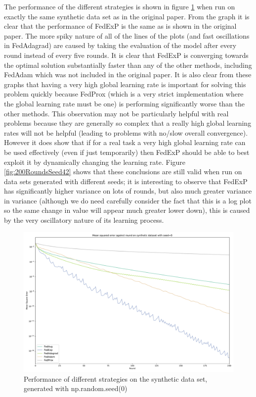 \documentclass{article}
\begin{document}
The performance of the different strategies is shown in figure \ref{fig:200RoundsSeed0} when run on exactly the same synthetic data set as in the original paper.  From the graph it is clear that the performance of FedExP is the same as is shown in the original paper.  The more spiky nature of all of the lines of the plots (and fast oscillations in FedAdagrad) are caused by taking the evaluation of the model after every round instead of every five rounds.  It is clear that FedExP is converging towards the optimal solution substantially faster than any of the other methods, including FedAdam which was not included in the original paper.  It is also clear from these graphs that having a very high global learning rate is important for solving this problem quickly because FedProx (which is a very strict implementation where the global learning rate must be one) is performing significantly worse than the other methods.  This observation may not be particularly helpful with real problems because they are generally so complex that a really high global learning rates will not be helpful (leading to problems with no/slow overall convergence).  However it does show that if for a real task a very high global learning rate can be used effectively (even if just temporarily) then FedExP should be able to best exploit it by dynamically changing the learning rate.  Figure \ref{fig:200RoundsSeed42} shows that these conclusions are still valid when run on data sets generated with different seeds; it is interesting to observe that FedExP has significantly higher variance on lots of rounds, but also much greater variance in variance (although we do need carefully consider the fact that this is a log plot so the same change in value will appear much greater lower down), this is caused by the very oscillatory nature of its learning process.

\begin{figure}
    \centerline{\includegraphics[width=.6\linewidth]{figs/syntheticSeed0_200Rounds.pdf}}
    \caption{Performance of different strategies on the synthetic data set, generated with np.random.seed(0)}
    \label{fig:200RoundsSeed0}
\end{figure}
\end{document}
